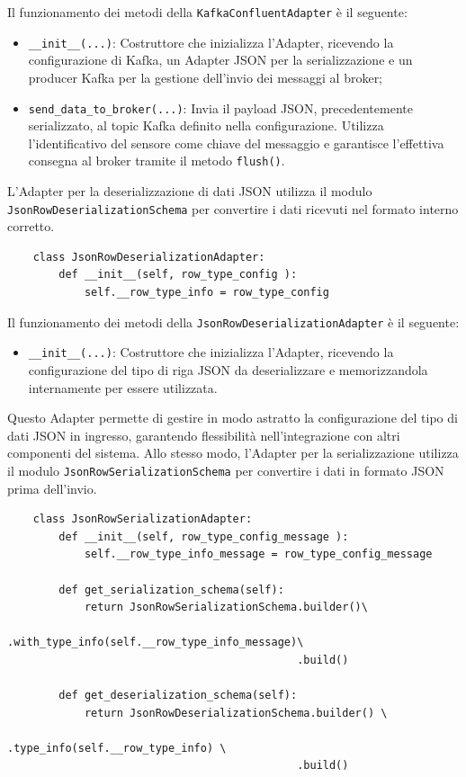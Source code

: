 \documentclass[10pt]{article}
\begin{document}
    Il funzionamento dei metodi della \texttt{KafkaConfluentAdapter} è il seguente:
    \begin{itemize}
        \item \texttt{\_\_init\_\_(...)}: Costruttore che inizializza l'Adapter, ricevendo la configurazione di Kafka, un Adapter JSON per la serializzazione e un producer Kafka per la gestione dell'invio dei messaggi al broker;
        \item \texttt{send\_data\_to\_broker(...)}: Invia il payload JSON, precedentemente serializzato, al topic Kafka definito nella configurazione. Utilizza l'identificativo del sensore come chiave del messaggio e garantisce l'effettiva consegna al broker tramite il metodo \texttt{flush()}.
    \end{itemize}
    L'Adapter per la deserializzazione di dati JSON utilizza il modulo \texttt{JsonRowDeserializationSchema} per convertire i dati ricevuti nel formato interno corretto.
    \begin{lstlisting}
    class JsonRowDeserializationAdapter:
        def __init__(self, row_type_config ):
            self.__row_type_info = row_type_config
    \end{lstlisting}
    Il funzionamento dei metodi della \texttt{JsonRowDeserializationAdapter} è il seguente:
    \begin{itemize}
        \item \texttt{\_\_init\_\_(...)}: Costruttore che inizializza l'Adapter, ricevendo la configurazione del tipo di riga JSON da deserializzare e memorizzandola internamente per essere utilizzata.
    \end{itemize}
    Questo Adapter permette di gestire in modo astratto la configurazione del tipo di dati JSON in ingresso, garantendo flessibilità nell'integrazione con altri componenti del sistema.
    Allo stesso modo, l'Adapter per la serializzazione utilizza il modulo \texttt{JsonRowSerializationSchema} per convertire i dati in formato JSON prima dell'invio.
    \begin{lstlisting}
    class JsonRowSerializationAdapter:
        def __init__(self, row_type_config_message ):
            self.__row_type_info_message = row_type_config_message

        def get_serialization_schema(self):
            return JsonRowSerializationSchema.builder()\
                                             .with_type_info(self.__row_type_info_message)\
                                             .build()

        def get_deserialization_schema(self):
            return JsonRowDeserializationSchema.builder() \
                                             .type_info(self.__row_type_info) \
                                             .build()
    \end{lstlisting}
\end{document}
